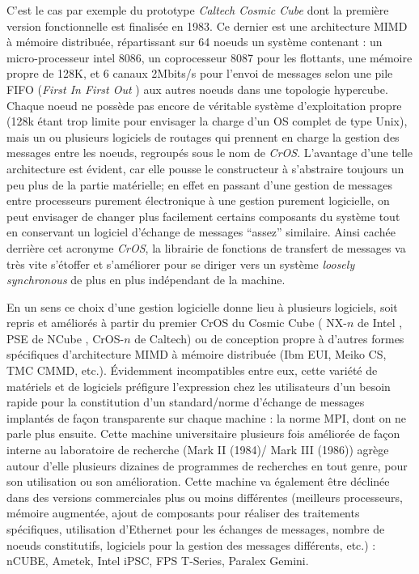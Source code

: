 C'est le cas par exemple du prototype \textit{Caltech Cosmic Cube} dont la première version fonctionnelle est finalisée en 1983. Ce dernier est une architecture MIMD à mémoire distribuée, répartissant sur 64 noeuds un système contenant : un micro-processeur intel 8086, un coprocesseur 8087 pour les flottants, une mémoire propre de 128K, et 6 canaux 2Mbits/s pour l'envoi de messages selon une pile FIFO (\textit{First In First Out} ) aux autres noeuds dans une topologie hypercube. Chaque noeud ne possède pas encore de véritable système d'exploitation propre (128k étant trop limite pour envisager la charge d'un OS complet de type Unix), mais un ou plusieurs logiciels de routages qui prennent en charge la gestion des messages entre les noeuds, regroupés sous le nom de \textit{CrOS}. L'avantage d'une telle architecture est évident, car elle pousse le constructeur à s'abstraire toujours un peu plus de la partie matérielle; en effet en passant d'une gestion de messages entre processeurs purement électronique à une gestion purement logicielle, on peut envisager de changer plus facilement certains composants du système tout en conservant un logiciel d'échange de messages \enquote{assez} similaire. Ainsi cachée derrière cet acronyme \textit{CrOS}, la librairie de fonctions de transfert de messages va très vite s'étoffer et s'améliorer pour se diriger vers un système \textit{loosely synchronous}  de plus en plus indépendant de la machine.  %

En un sens ce choix d'une gestion logicielle donne lieu à plusieurs logiciels, soit repris et améliorés à partir du premier CrOS du Cosmic Cube ( NX-$n$ de Intel , PSE de NCube , CrOS-$n$ de Caltech) ou de conception propre à d'autres formes spécifiques d'architecture MIMD à mémoire distribuée (Ibm EUI, Meiko CS, TMC CMMD, etc.). Évidemment incompatibles entre eux, cette variété de matériels et de logiciels préfigure l'expression chez les utilisateurs d'un besoin rapide pour la constitution d'un standard/norme d'échange de messages implantés de façon transparente sur chaque machine : la norme MPI, dont on ne parle plus ensuite. Cette machine universitaire plusieurs fois améliorée de façon interne au laboratoire de recherche (Mark II (1984)/ Mark III (1986)) agrège autour d'elle plusieurs dizaines de programmes de recherches en tout genre, pour son utilisation ou son amélioration. Cette machine va également être déclinée dans des versions commerciales plus ou moins différentes (meilleurs processeurs, mémoire augmentée, ajout de composants pour réaliser des traitements spécifiques, utilisation d'Ethernet pour les échanges de messages, nombre de noeuds constitutifs, logiciels pour la gestion des messages différents, etc.) : nCUBE, Ametek, Intel iPSC, FPS T-Series, Paralex Gemini.

